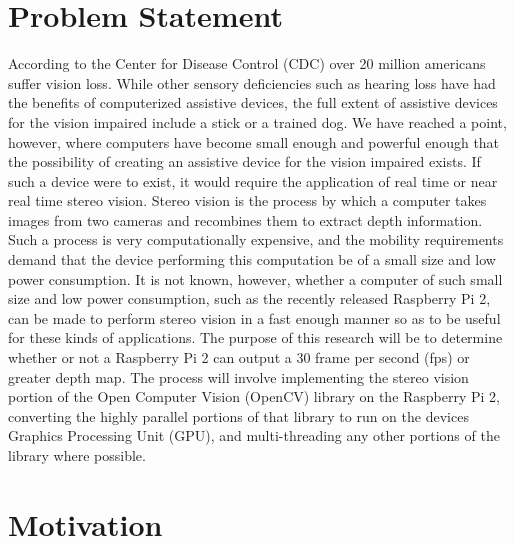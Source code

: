 \thispagestyle{plain}
\section{Problem Statement}
According to the Center for Disease Control (CDC) over 20 million americans suffer vision loss.
While other sensory deficiencies such as hearing loss have had the benefits of computerized assistive
devices, the full extent of assistive devices for the vision impaired include a stick or a trained dog.
We have reached a point, however, where computers have become small enough and powerful enough
that the possibility of creating an assistive device for the vision impaired exists.
If such a device were to exist, it would require the application of real time or near real time
stereo vision. Stereo vision is the process by which a computer takes images from two cameras and
recombines them to extract depth information. Such a process is very computationally expensive,
and the mobility requirements demand that the device performing this computation be of a small
size and low power consumption.
It is not known, however, whether a computer of such small size and low power consumption,
such as the recently released Raspberry Pi 2, can be made to perform stereo vision in a fast enough
manner so as to be useful for these kinds of applications. The purpose of this research will be to
determine whether or not a Raspberry Pi 2 can output a 30 frame per second (fps) or greater depth
map. The process will involve implementing the stereo vision portion of the Open Computer Vision
(OpenCV) library on the Raspberry Pi 2, converting the highly parallel portions of that library to
run on the devices Graphics Processing Unit (GPU), and multi-threading any other portions of the
library where possible.

\section{Motivation}